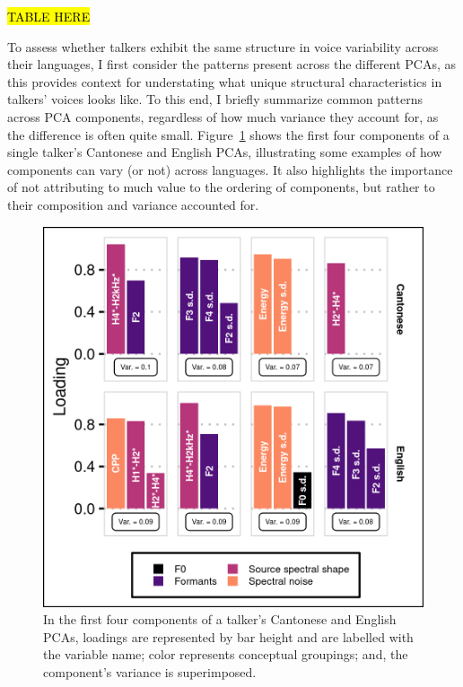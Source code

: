 \hl{TABLE HERE}

To assess whether talkers exhibit the same structure in voice variability across their languages, I first consider the patterns present across the different PCAs, as this provides context for understating what unique structural characteristics in talkers' voices looks like. To this end, I briefly summarize common patterns across PCA components, regardless of how much variance they account for, as the difference is often quite small. Figure~\ref{ch3:fig:VF32A} shows the first four components of a single talker's Cantonese and English PCAs, illustrating some examples of how components can vary (or not) across languages. It also highlights the importance of not attributing to much value to the ordering of components, but rather to their composition and variance accounted for.

\begin{figure}[htbp]
\begin{center}
\includegraphics[width=0.875\linewidth]{figures/3-VF32A_pretty.png} 
\caption{In the first four components of a talker's Cantonese and English PCAs, loadings are represented by bar height and are labelled with the variable name; color represents conceptual groupings; and, the component's variance is superimposed.}
\label{ch3:fig:VF32A}
\end{center}
\end{figure}

